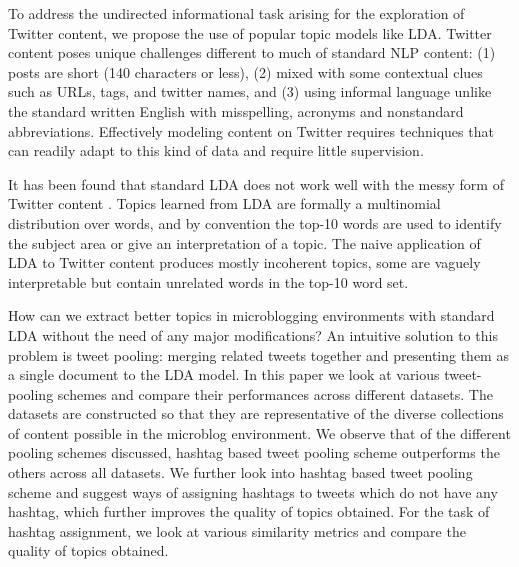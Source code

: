\documentclass[10pt,a5paper,twoside]{article}
\begin{document}
To address the undirected informational task arising for the 
exploration of Twitter content, we propose the use of popular topic
models like LDA.
Twitter content poses unique challenges different to much of standard
NLP content:  (1)
posts are short (140 characters or less),
(2)
mixed with some contextual clues such as URLs, tags, and twitter names, and
(3)
using informal language unlike the standard written English
with  misspelling, acronyms and nonstandard abbreviations.
Effectively modeling content on Twitter
requires techniques that can readily adapt to this kind of data and
require little supervision.

It has been found that standard LDA \cite{blei03} 
does not work well 
with the messy form of Twitter content \cite{wayne,????}. 
Topics learned from LDA are formally a
multinomial distribution over words, and by convention the top-10
words are used to identify the subject area or give an interpretation
of a topic.   The naive
application of LDA to Twitter content produces mostly incoherent topics,
some are vaguely interpretable but contain unrelated words in the
top-10 word set.

How can we extract better topics in
microblogging environments with standard LDA without the need of any
major modifications?  An intuitive solution to this problem is tweet
pooling: merging related tweets together and presenting them as a
single document to the LDA model.  
In this paper we look at various tweet-pooling schemes and compare
their performances across different datasets. The datasets are
constructed so that they are representative of the diverse
collections of content possible in the microblog environment.
We observe that of the different pooling schemes discussed, hashtag
based tweet pooling scheme outperforms the others across all
datasets. We further look into hashtag based tweet pooling scheme and
suggest ways of assigning hashtags to tweets which do not have any
hashtag, which further improves the quality of topics obtained. For
the task of hashtag assignment, we look at various similarity metrics
and compare the quality of topics obtained.
\end{document}
